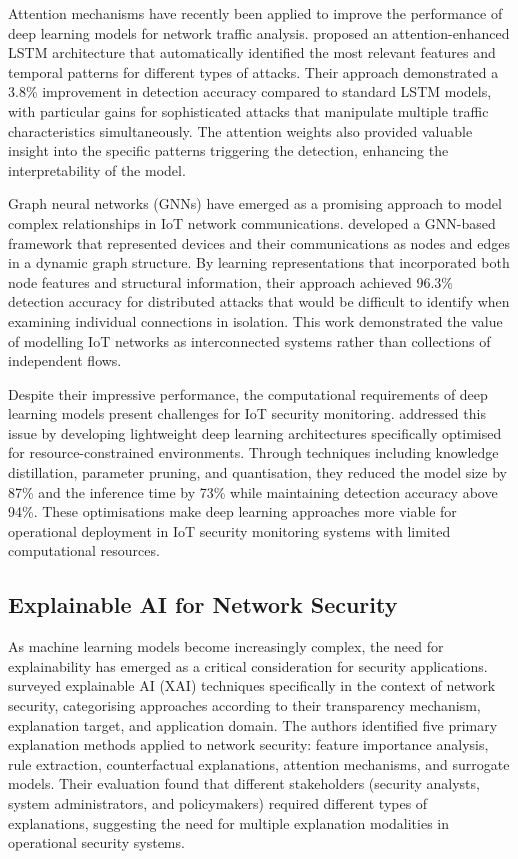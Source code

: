 Attention mechanisms have recently been applied to improve the performance of deep learning models for network traffic analysis. \cite{Zhang2021} proposed an attention-enhanced LSTM architecture that automatically identified the most relevant features and temporal patterns for different types of attacks. Their approach demonstrated a 3.8\% improvement in detection accuracy compared to standard LSTM models, with particular gains for sophisticated attacks that manipulate multiple traffic characteristics simultaneously. The attention weights also provided valuable insight into the specific patterns triggering the detection, enhancing the interpretability of the model.

Graph neural networks (GNNs) have emerged as a promising approach to model complex relationships in IoT network communications. \cite{Zhou2020} developed a GNN-based framework that represented devices and their communications as nodes and edges in a dynamic graph structure. By learning representations that incorporated both node features and structural information, their approach achieved 96.3\% detection accuracy for distributed attacks that would be difficult to identify when examining individual connections in isolation. This work demonstrated the value of modelling IoT networks as interconnected systems rather than collections of independent flows.

Despite their impressive performance, the computational requirements of deep learning models present challenges for IoT security monitoring. \cite{Guo2021} addressed this issue by developing lightweight deep learning architectures specifically optimised for resource-constrained environments. Through techniques including knowledge distillation, parameter pruning, and quantisation, they reduced the model size by 87\% and the inference time by 73\% while maintaining detection accuracy above 94\%. These optimisations make deep learning approaches more viable for operational deployment in IoT security monitoring systems with limited computational resources.

\subsection{Explainable AI for Network Security}

As machine learning models become increasingly complex, the need for explainability has emerged as a critical consideration for security applications. \cite{Mahbooba2021} surveyed explainable AI (XAI) techniques specifically in the context of network security, categorising approaches according to their transparency mechanism, explanation target, and application domain. The authors identified five primary explanation methods applied to network security: feature importance analysis, rule extraction, counterfactual explanations, attention mechanisms, and surrogate models. Their evaluation found that different stakeholders (security analysts, system administrators, and policymakers) required different types of explanations, suggesting the need for multiple explanation modalities in operational security systems.

